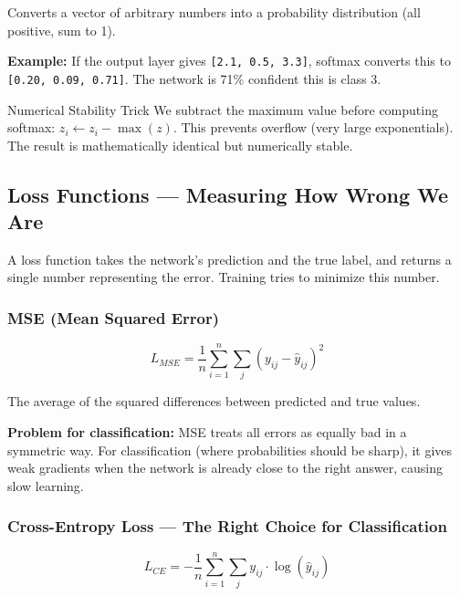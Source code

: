 \documentclass[12pt, a4paper]{article}
\begin{document}
Converts a vector of arbitrary numbers into a probability distribution (all positive, sum to 1).

\textbf{Example:} If the output layer gives \texttt{[2.1, 0.5, 3.3]}, softmax converts this to \texttt{[0.20, 0.09, 0.71]}. The network is 71\% confident this is class 3.

\begin{warningbox}{Numerical Stability Trick}
We subtract the maximum value before computing softmax: $z_i \leftarrow z_i - \max(z)$. This prevents overflow (very large exponentials). The result is mathematically identical but numerically stable.
\end{warningbox}

\subsection{Loss Functions --- Measuring How Wrong We Are}

A loss function takes the network's prediction and the true label, and returns a single number representing the error. Training tries to minimize this number.

\subsubsection{MSE (Mean Squared Error)}

\begin{equation}
  L_{MSE} = \frac{1}{n} \sum_{i=1}^{n} \sum_j (y_{ij} - \hat{y}_{ij})^2
\end{equation}

The average of the squared differences between predicted and true values.

\textbf{Problem for classification:} MSE treats all errors as equally bad in a symmetric way. For classification (where probabilities should be sharp), it gives weak gradients when the network is already close to the right answer, causing slow learning.

\subsubsection{Cross-Entropy Loss --- The Right Choice for Classification}

\begin{equation}
  L_{CE} = -\frac{1}{n} \sum_{i=1}^{n} \sum_j y_{ij} \cdot \log(\hat{y}_{ij})
\end{equation}
\end{document}
